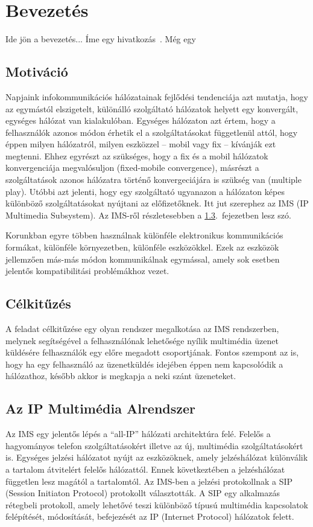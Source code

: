
\section{Bevezetés}

Ide jön a bevezetés... Íme egy hivatkozás~\cite{KonyvId}. Még egy~\cite{sds_tech_desc}

\subsection{Motiváció}

Napjaink infokommunikációs hálózatainak fejlődési tendenciája azt mutatja, hogy az egymástól elszigetelt,
különálló szolgáltató hálózatok helyett egy konvergált, egységes hálózat van kialakulóban. Egységes hálózaton azt értem, hogy a felhasználók azonos módon érhetik el a szolgáltatásokat függetlenül attól, hogy éppen milyen hálózatról, milyen eszközzel -- mobil vagy fix -- kívánják ezt megtenni. Ehhez egyrészt az szükséges, hogy a fix és a mobil hálózatok konvergenciája megvalósuljon (fixed-mobile convergence), másrészt a szolgáltatások azonos hálózatra történő konvergeciájára is szükség van (multiple play). Utóbbi azt jelenti, hogy egy szolgáltató ugyanazon a hálózaton képes különböző szolgáltatásokat nyújtani az előfizetőknek. Itt jut szerephez az IMS (IP Multimedia Subsystem). Az IMS-ről részletesebben a \ref{sec:ims}.~fejezetben lesz szó.

Korunkban egyre többen használnak különféle elektronikus kommunikációs formákat, különféle környezetben, különféle eszközökkel. Ezek az eszközök jellemzően más-más módon kommunikálnak egymással, amely sok esetben jelentős kompatibilitási problémákhoz vezet.

\subsection{Célkitűzés}

A feladat célkitűzése egy olyan rendszer megalkotása az IMS rendszerben, melynek
segítségével a felhasználónak lehetősége nyílik multimédia üzenet küldésére felhasználók egy előre megadott csoportjának. Fontos szempont az is, hogy ha egy felhasználó az üzenetküldés idejében éppen nem kapcsolódik a hálózathoz, később akkor is megkapja a neki szánt üzeneteket.

\subsection{Az IP Multimédia Alrendszer}
\label{sec:ims}

Az IMS egy jelentős lépés a ``all-IP'' hálózati architektúra felé. Felelős a hagyományos telefon szolgáltatásokért illetve az új, multimédia szolgáltatásokért is. Egységes jelzési hálózatot nyújt az eszközöknek, amely jel\-zés\-há\-ló\-zat különválik a tartalom átvitelért felelős hálózattól. Ennek következtében a jelzéshálózat független lesz magától a tartalomtól. Az IMS-ben a jelzési protokollnak a  SIP (Session Initiaton Protocol) protokollt választották. A SIP egy alkalmazás rétegbeli protokoll, amely lehetővé teszi különböző típusú multimédia kapcsolatok felépítését, módosítását, befejezését az IP (Internet Protocol) hálózatok felett.


